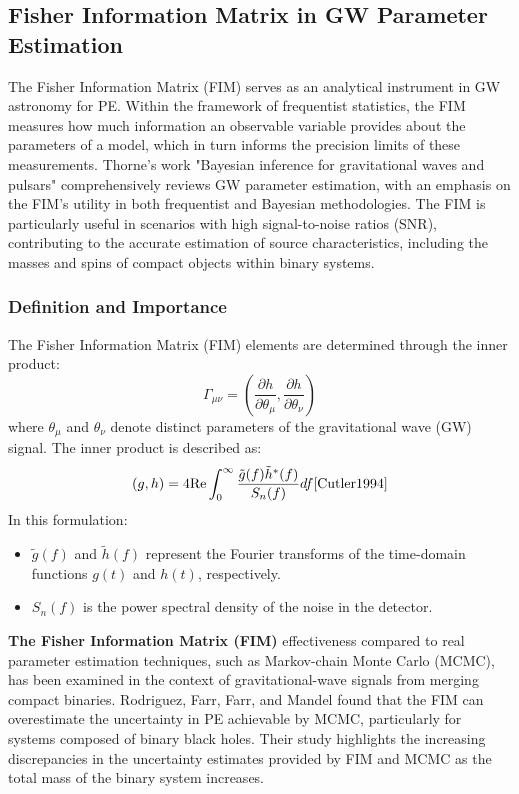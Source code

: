 \documentclass[12pt]{article}
\begin{document}
\subsection{Fisher Information Matrix in GW Parameter Estimation}
The Fisher Information Matrix (FIM) serves as an analytical instrument in GW astronomy for PE. Within the framework of frequentist statistics, the FIM measures how much information an observable variable provides about the parameters of a model, which in turn informs the precision limits of these measurements. Thorne's work "Bayesian inference for gravitational waves and pulsars" \cite{Thorne2002} comprehensively reviews GW parameter estimation, with an emphasis on the FIM's utility in both frequentist and Bayesian methodologies. The FIM is particularly useful in scenarios with high signal-to-noise ratios (SNR), contributing to the accurate estimation of source characteristics, including the masses and spins of compact objects within binary systems.

\subsubsection*{Definition and Importance}
The Fisher Information Matrix (FIM) elements are determined through the inner product:
\begin{equation}
    \Gamma_{\mu\nu} = \left( \frac{\partial h}{\partial \theta_\mu}, \frac{\partial h}{\partial \theta_\nu} \right)
\end{equation}
where $\theta_\mu$ and $\theta_\nu$ denote distinct parameters of the gravitational wave (GW) signal. The inner product is described as:
\begin{equation}
    (g, h) = 4 \text{Re} \int_{0}^{\infty} \frac{\tilde{g}(f) \tilde{h}^*(f)}{S_n(f)} df \cite{Cutler1994}
\end{equation}
In this formulation:
\begin{itemize}
    \item $\tilde{g}(f)$ and $\tilde{h}(f)$ represent the Fourier transforms of the time-domain functions $g(t)$ and $h(t)$, respectively.
    \item $S_n(f)$ is the power spectral density of the noise in the detector.
\end{itemize}


\textbf{The Fisher Information Matrix (FIM)} effectiveness compared to real parameter estimation techniques, such as Markov-chain Monte Carlo (MCMC), has been examined in the context of gravitational-wave signals from merging compact binaries. Rodriguez, Farr, Farr, and Mandel \cite{Rodriguez2013} found that the FIM can overestimate the uncertainty in PE achievable by MCMC, particularly for systems composed of binary black holes. Their study highlights the increasing discrepancies in the uncertainty estimates provided by FIM and MCMC as the total mass of the binary system increases.
\end{document}
